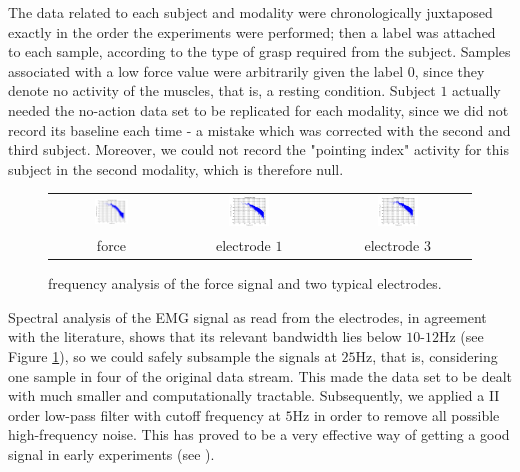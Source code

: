The data related to each subject and modality were chronologically
juxtaposed exactly in the order the experiments were performed; then a
label was attached to each sample, according to the type of grasp
required from the subject. Samples associated with a low force value
were arbitrarily given the label $0$, since they denote no activity of
the muscles, that is, a resting condition. Subject $1$ actually needed
the no-action data set to be replicated for each modality, since we
did not record its baseline each time - a mistake which was corrected
with the second and third subject. Moreover, we could not record the
"pointing index" activity for this subject in the second modality,
which is therefore null.

\begin{figure}[!ht] \centering
  \begin{tabular}{ccc}
    \includegraphics[width=0.3\textwidth]{figs/spectrum_force} &
    \includegraphics[width=0.3\textwidth]{figs/spectrum_electrode_1} &
    \includegraphics[width=0.3\textwidth]{figs/spectrum_electrode_3} \\
    force & electrode $1$ & electrode $3$ \\
  \end{tabular}
  \caption{frequency analysis of the force signal and two
    typical electrodes.}
  \label{fig:spectra}
\end{figure}

Spectral analysis of the EMG signal as read from the electrodes, in
agreement with the literature, shows that its relevant bandwidth lies
below $10$-$12$Hz (see Figure \ref{fig:spectra}), so we could safely
subsample the signals at $25$Hz, that is, considering one sample in
four of the original data stream. This made the data set to be dealt
with much smaller and computationally tractable. Subsequently, we
applied a II order low-pass filter with cutoff frequency at $5$Hz in
order to remove all possible high-frequency noise. This has proved to
be a very effective way of getting a good signal in early experiments
(see \cite{2008.Neurorob}).


